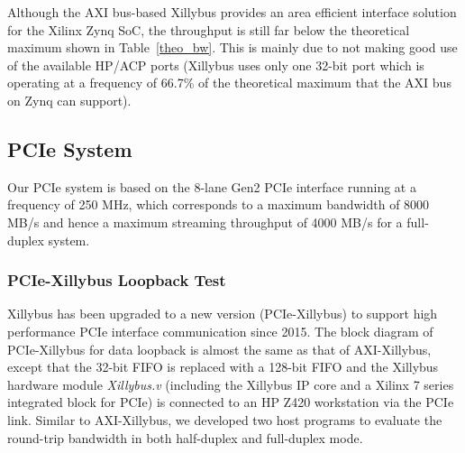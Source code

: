 \begin{table}[tb]
	\caption{Area overhead of AXI bus-based systems.}
	\label{xillybus_mxp_area}
	\centering
\end{table}

Although the AXI bus-based Xillybus provides an area efficient interface solution for the Xilinx Zynq SoC, the throughput is still far below the theoretical maximum shown in Table~\ref{theo_bw}. 
This is mainly due to not making good use of the available HP/ACP ports (Xillybus uses only one 32-bit port which is operating at a frequency of 66.7\% of the theoretical maximum that the AXI bus on Zynq can support). 


\subsection{PCIe System}
Our PCIe system is based on the 8-lane Gen2 PCIe interface running at a frequency of 250 MHz, which corresponds to a maximum bandwidth of 8000 MB/s and hence a maximum streaming throughput of 4000 MB/s for a full-duplex system. 

\subsubsection{PCIe-Xillybus Loopback Test}
Xillybus has been upgraded to a new version (PCIe-Xillybus) to support high performance PCIe interface communication since 2015. 
The block diagram of PCIe-Xillybus for data loopback is almost the same as that of AXI-Xillybus, except that the 32-bit FIFO is replaced with a 128-bit FIFO and the Xillybus hardware module \textit{Xillybus.v} (including the Xillybus IP core and a Xilinx 7 series integrated block for PCIe) is connected to an HP Z420 workstation via the PCIe link. 
Similar to AXI-Xillybus, we developed two host programs to evaluate the round-trip bandwidth in both half-duplex and full-duplex mode. 

